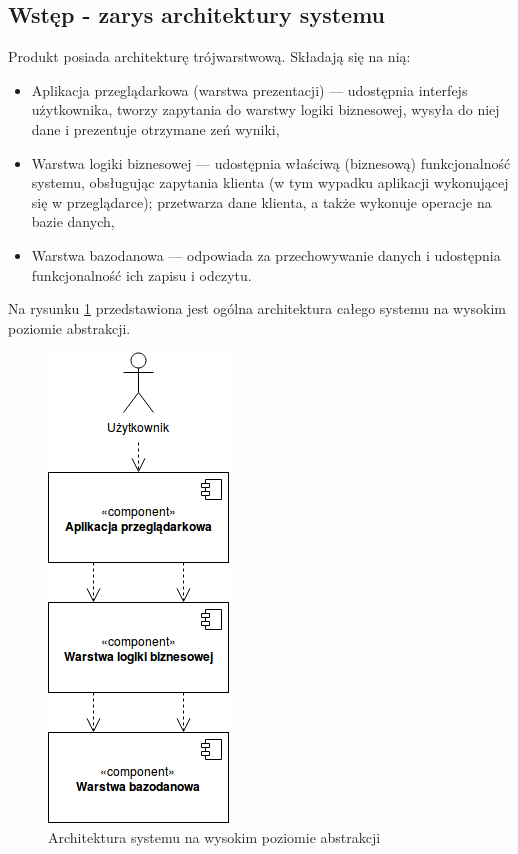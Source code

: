 \documentclass[polish,12pt]{aghthesis}
\begin{document}
\subsection{Wstęp - zarys architektury systemu}
Produkt posiada architekturę trójwarstwową. Składają się na nią:
\begin{itemize}
    \item Aplikacja przeglądarkowa (warstwa prezentacji) --- udostępnia interfejs użytkownika, tworzy zapytania do warstwy logiki biznesowej, wysyła do niej dane i prezentuje otrzymane zeń wyniki,
    \item Warstwa logiki biznesowej --- udostępnia właściwą (biznesową) funkcjonalność systemu, obsługując zapytania klienta (w tym wypadku aplikacji wykonującej się w przeglądarce); przetwarza dane klienta, a także wykonuje operacje na bazie danych,
    \item Warstwa bazodanowa --- odpowiada za przechowywanie danych i udostępnia funkcjonalność ich zapisu i odczytu.
\end{itemize}

Na rysunku \ref{architektura} przedstawiona jest ogólna architektura całego systemu na wysokim poziomie abstrakcji.

\begin{figure}[H]
    \centering
    \includegraphics{architektura}
    \caption{Architektura systemu na wysokim poziomie abstrakcji}
    \label{architektura}
\end{figure}
\end{document}
